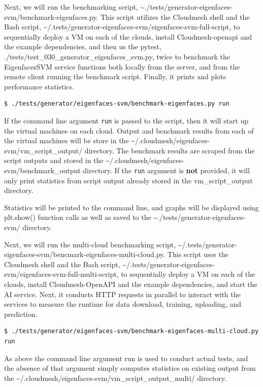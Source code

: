 Next, we will run the benchmarking script,
\textasciitilde./tests/generator-eigenfaces-svm/benchmark-eigenfaces.py.
This script utilizes the Cloudmesh shell and the Bash script,
\textasciitilde/.tests/generator-eigenfaces-svm/eigenfaces-svm-full-script,
to sequentially deploy a VM on each of the clouds, install
Cloudmesh-openapi and the example dependencies, and then us the pytest,
./tests/test\_030\_generator\_eigenfaces\_svm.py, twice to benchmark the
EigenfacesSVM service functions both locally from the server, and from
the remote client running the benchmark script. Finally, it prints and
plots performance statistics.

\begin{verbatim}
$ ./tests/generator/eigenfaces-svm/benchmark-eigenfaces.py run
\end{verbatim}

If the command line argument \texttt{run} is passed to the script, then
it will start up the virtual machines on each cloud. Output and
benchmark results from each of the virtual machines will be store in the
\textasciitilde/.cloudmesh/eigenfaces-svm/vm\_script\_output/ directory.
The benchmark results are scraped from the script outputs and stored in
the \textasciitilde/.cloudmesh/eigenfaces-svm/benchmark\_output
directory. If the \texttt{run} argument is \textbf{not} provided, it
will only print statistics from script output already stored in the
vm\_script\_output directory.

Statistics will be printed to the command line, and graphs will be
displayed using plt.show() function calls as well as saved to the
\textasciitilde./tests/generator-eigenfaces-svm/ directory.

Next, we will run the multi-cloud benchmarking script,
\textasciitilde/.tests/generator-eigenfaces-svm/bencmark-eigenfaces-multi-cloud.py.
This script uses the Cloudmesh shell and the Bash script,
\textasciitilde/.tests/generator-eigenfaces-svm/eigenfaces-svm-full-multi-script,
to sequentially deploy a VM on each of the clouds, install
Cloudmesh-OpenAPI and the example dependencies, and start the AI
service. Next, it conducts HTTP requests in parallel to interact with
the services to measure the runtime for data download, training,
uploading, and prediction.

\begin{verbatim}
$ ./tests/generator/eigenfaces-svm/benchmark-eigenfaces-multi-cloud.py run
\end{verbatim}

As above the command line argument run is used to conduct actual tests,
and the absence of that argument simply computes statistics on existing
output from the
\textasciitilde/.cloudmesh/eigenfaces-svm/vm\_script\_output\_multi/
directory.


